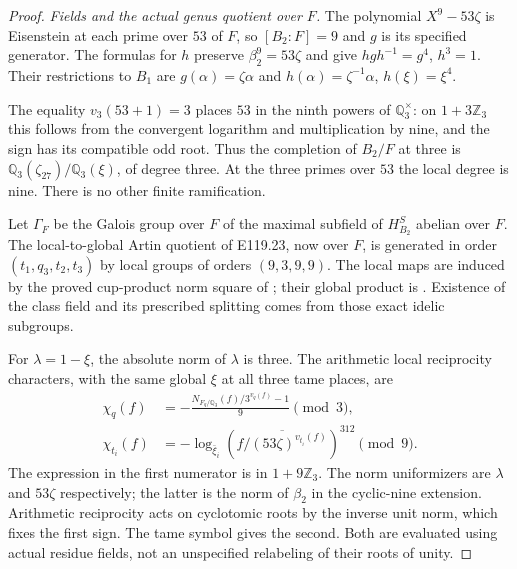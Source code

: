 \begin{proof}
\emph{Fields and the actual genus quotient over $F$.}
The polynomial $X^9-53\zeta$ is Eisenstein at each prime over
$53$ of $F$, so $[B_2:F]=9$ and $g$ is its specified generator.
The formulas for $h$ preserve $\beta_2^9=53\zeta$ and give
$hgh^{-1}=g^4$, $h^3=1$. Their restrictions to $B_1$ are
$g(\alpha)=\zeta\alpha$ and
$h(\alpha)=\zeta^{-1}\alpha$, $h(\xi)=\xi^4$.

The equality $v_3(53+1)=3$ places $53$ in the ninth powers
of $\mathbb Q_3^\times$: on $1+3\mathbb Z_3$ this follows
from the convergent logarithm and multiplication by nine,
and the sign has its compatible odd root. Thus the completion
of $B_2/F$ at three is
$\mathbb Q_3(\zeta_{27})/\mathbb Q_3(\xi)$, of degree three.
At the three primes over $53$ the local degree is nine.
There is no other finite ramification.

Let $\Gamma_F$ be the Galois group over $F$ of the maximal
subfield of $H^S_{B_2}$ abelian over $F$. The local-to-global
Artin quotient of E119.23, now over $F$, is generated in order
$(t_1,q_3,t_2,t_3)$ by local groups of orders $(9,3,9,9)$.
The local maps are induced by the proved cup-product norm
square of \cite[III,Theorem3.1]{E_MilneCFT}; their global product
is \cite[V,Proposition5.2,Theorems5.3 and5.5]{E_MilneCFT}.
Existence of the class field and its prescribed splitting
comes from those exact idelic subgroups.

For $\lambda=1-\xi$, the absolute norm of $\lambda$ is three.
The arithmetic local reciprocity characters, with the same
global $\xi$ at all three tame places, are
\[
 \begin{aligned}
 \chi_q(f)
   &=-\frac{N_{F_q/\mathbb Q_3}(f)/3^{v_q(f)}-1}{9}
                                                    \pmod3,\\
 \chi_{t_i}(f)
   &=-\log_{\bar\xi_i}
       \left(\overline{f/(53\zeta)^{v_{t_i}(f)}}\right)^{312}
                                                    \pmod9.
 \end{aligned}
 \tag{E121.10}
\]
The expression in the first numerator is in $1+9\mathbb Z_3$.
The norm uniformizers are $\lambda$ and $53\zeta$ respectively;
the latter is the norm of $\beta_2$ in the cyclic-nine extension.
Arithmetic reciprocity acts on cyclotomic roots by the inverse
unit norm, which fixes the first sign. The tame symbol gives
the second. Both are evaluated using actual residue fields,
not an unspecified relabeling of their roots of unity.


\end{proof}
